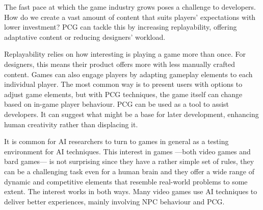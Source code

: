 \documentclass[runningheads,a4paper]{llncs}
\begin{document}


The fast pace at which the game industry grows poses a challenge to developers. 
How do we create a vast amount of content that suits 
players' expectations with lower investment? PCG can tackle this by  
increasing replayability, offering adaptative content or reducing designers' 
workload.\cite{togelius2016introduction}

Replayability relies on how interesting is 
playing a game more than once. For designers, this means their 
product offers more with less manually crafted content. 
Games can also engage players by adapting gameplay elements to each individual 
player. The most common way is 
to present users with options to adjust game elements, but with PCG techniques, 
the game itself can change based on in-game player behaviour.
PCG can be used as a tool to assist developers. It can suggest what might be a 
base for later development, enhancing human creativity rather than displacing 
it. 


It is common for AI researchers to turn to games in general as a testing 
environment for AI techniques.
This interest in games ---both video games and bard games--- is not 
surprising since they have a rather simple set of rules, they can be a 
challenging task even for a human brain and they offer a wide range of dynamic 
and competitive elements that resemble real-world problems to some extent. The 
interest works in both ways. Many video games use AI techniques to deliver 
better experiences, mainly involving NPC behaviour and PCG.
\end{document}
